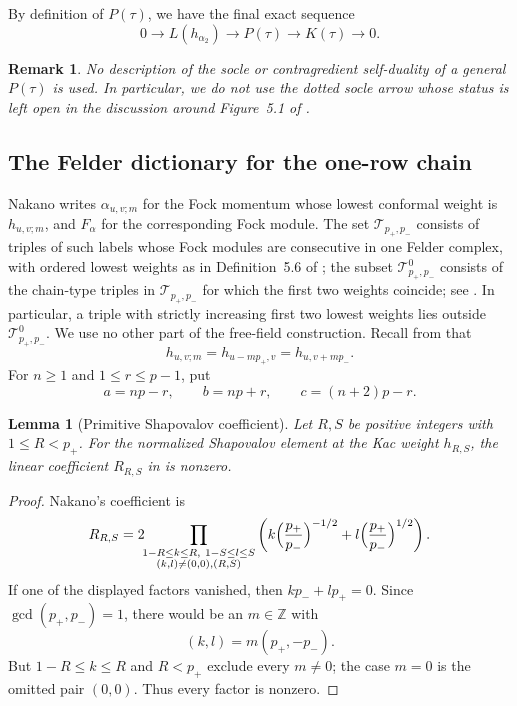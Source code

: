 \documentclass[12pt,leqno]{amsart}
\numberwithin{equation}{section}
\newtheorem{lem}[thm]{Lemma}
\newtheorem{rmk}[thm]{Remark}
\def\Z{\mathbb{Z}}
\begin{document}
By definition of $P(\tau)$, we have the final exact sequence
\begin{equation}\label{eq:Nakano-tower-P}
 0\longrightarrow L(h_{\alpha_2})\longrightarrow P(\tau)
 \longrightarrow K(\tau)\longrightarrow0.
\end{equation}

\begin{rmk}\label{rmk:no-socle}
No description of the socle or contragredient self-duality of a general
$P(\tau)$ is used.  In particular, we do not use the dotted socle arrow
whose status is left open in the discussion around Figure~5.1 of
\cite{Nakano}.
\end{rmk}

\subsection{The Felder dictionary for the one-row chain}

Nakano writes $\alpha_{u,v;m}$ for the Fock momentum whose lowest
conformal weight is $h_{u,v;m}$, and $F_{\alpha}$ for the corresponding
Fock module.  The set $\mathcal T_{p_+,p_-}$ consists of triples of such
labels whose Fock modules are consecutive in one Felder complex, with
ordered lowest weights as in Definition~5.6 of \cite{Nakano};
the subset $\mathcal T^0_{p_+,p_-}$ consists of the chain-type triples
in $\mathcal T_{p_+,p_-}$ for which the first two weights coincide; see
\cite[Definition~5.7]{Nakano}.  In particular, a triple with strictly
increasing first two lowest weights lies outside
$\mathcal T^0_{p_+,p_-}$.  We use no other part of the free-field
construction.  Recall
from \cite[(2.3)--(2.4)]{Nakano} that
\begin{equation}\label{eq:Nakano-weight-shift}
 h_{u,v;m}=h_{u-mp_+,v}=h_{u,v+mp_-}.
\end{equation}
For $n\geq1$ and $1\leq r\leq p-1$, put
\begin{equation}\label{eq:abc}
 a=np-r,\qquad b=np+r,\qquad c=(n+2)p-r.
\end{equation}

\begin{lem}[Primitive Shapovalov coefficient]
\label{lem:primitive-Shapovalov-coefficient}
Let $R,S$ be positive integers with $1\le R<p_+$.  For the normalized
Shapovalov element at the Kac weight $h_{R,S}$, the linear coefficient
$R_{R,S}$ in \cite[Proposition~5.2]{Nakano} is nonzero.
\end{lem}

\begin{proof}
Nakano's coefficient is
\[
 R_{R,S}=2\!\!\prod_{\substack{
 1-R\le k\le R,\ 1-S\le l\le S\\
 (k,l)\ne(0,0),(R,S)}}
 \left(
 k\Bigl(\frac{p_+}{p_-}\Bigr)^{-1/2}
 +l\Bigl(\frac{p_+}{p_-}\Bigr)^{1/2}
 \right).
\]
If one of the displayed factors vanished, then
$kp_-+lp_+=0$.  Since $\gcd(p_+,p_-)=1$, there would be an
$m\in\Z$ with
\[
 (k,l)=m(p_+,-p_-).
\]
But $1-R\le k\le R$ and $R<p_+$ exclude every $m\ne0$; the case
$m=0$ is the omitted pair $(0,0)$.  Thus every factor is nonzero.
\end{proof}
\end{document}
